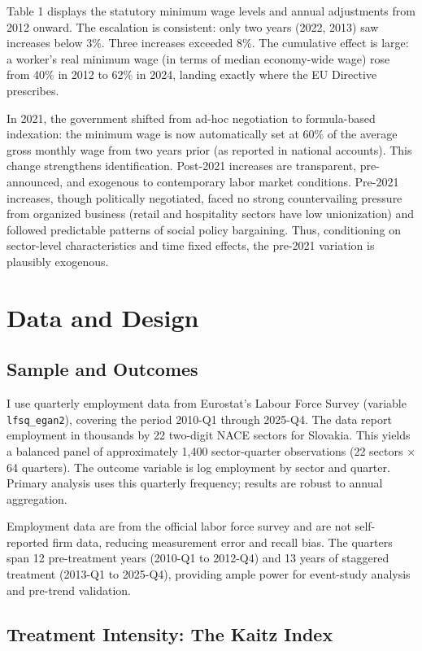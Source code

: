 \documentclass[12pt]{article}
\begin{document}
Table 1 displays the statutory minimum wage levels and annual adjustments from 2012 onward. The escalation is consistent: only two years (2022, 2013) saw increases below 3\%. Three increases exceeded 8\%. The cumulative effect is large: a worker's real minimum wage (in terms of median economy-wide wage) rose from 40\% in 2012 to 62\% in 2024, landing exactly where the EU Directive prescribes.

In 2021, the government shifted from ad-hoc negotiation to formula-based indexation: the minimum wage is now automatically set at 60\% of the average gross monthly wage from two years prior (as reported in national accounts). This change strengthens identification. Post-2021 increases are transparent, pre-announced, and exogenous to contemporary labor market conditions. Pre-2021 increases, though politically negotiated, faced no strong countervailing pressure from organized business (retail and hospitality sectors have low unionization) and followed predictable patterns of social policy bargaining. Thus, conditioning on sector-level characteristics and time fixed effects, the pre-2021 variation is plausibly exogenous.

\section{Data and Design}

\subsection{Sample and Outcomes}

I use quarterly employment data from Eurostat's Labour Force Survey (variable \texttt{lfsq\_egan2}), covering the period 2010-Q1 through 2025-Q4. The data report employment in thousands by 22 two-digit NACE sectors for Slovakia. This yields a balanced panel of approximately 1,400 sector-quarter observations (22 sectors × 64 quarters). The outcome variable is log employment by sector and quarter. Primary analysis uses this quarterly frequency; results are robust to annual aggregation.

Employment data are from the official labor force survey and are not self-reported firm data, reducing measurement error and recall bias. The quarters span 12 pre-treatment years (2010-Q1 to 2012-Q4) and 13 years of staggered treatment (2013-Q1 to 2025-Q4), providing ample power for event-study analysis and pre-trend validation.

\subsection{Treatment Intensity: The Kaitz Index}
\end{document}
